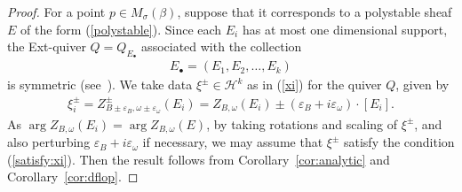 \documentclass[11pt]{amsart}
\theoremstyle{plain}
\theoremstyle{definition}
\theoremstyle{remark}
\newcommand{\hH}{\mathcal{H}}
\begin{document}
\begin{proof}
For a point $p \in M_{\sigma}(\beta)$, 
suppose that it corresponds to a 
polystable sheaf $E$ of the form (\ref{polystable}). 
Since each $E_i$ has at most 
one dimensional support,  
the Ext-quiver $Q=Q_{E_{\bullet}}$ 
associated with the collection 
\begin{align*}
E_{\bullet}=(E_1, E_2, \ldots, E_k)
\end{align*}
is 
symmetric (see~\cite[Lemma~5.1]{TodGV}). 
We take
data $\xi^{\pm} \in \hH^{k}$ as in (\ref{xi})
for the quiver $Q$, 
given by 
\begin{align*}
\xi^{\pm}_i=
Z^{\pm}_{B \pm \varepsilon_B, \omega \pm \varepsilon_{\omega}}(E_i)=
Z_{B, \omega}(E_i) \pm (\varepsilon_B+i\varepsilon_{\omega}) \cdot [E_i].
\end{align*}
As $\arg Z_{B, \omega}(E_i)=\arg Z_{B, \omega}(E)$, by 
taking rotations and scaling
of $\xi^{\pm}$, 
and also perturbing $\varepsilon_B+i\varepsilon_{\omega}$ if necessary, 
we may assume that $\xi^{\pm}$ satisfy the condition (\ref{satisfy:xi}). 
Then the result follows from 
Corollary~\ref{cor:analytic}
and Corollary~\ref{cor:dflop}. 
\end{proof}
\end{document}
